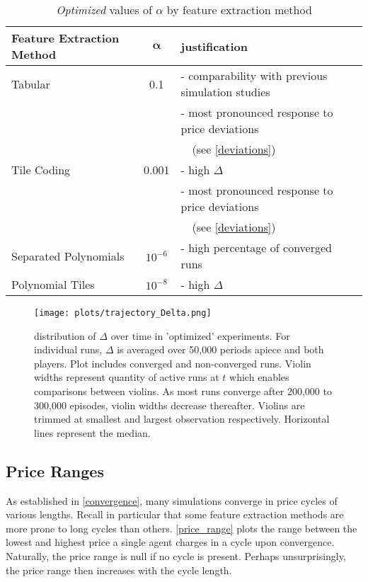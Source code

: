 \begin{table}

	\begin{tabular}{|l|c|l|}
		\hline
		\textbf{Feature Extraction Method}&$\boldsymbol{\alpha}$&\textbf{justification} \\
		\hline
		Tabular&0.1&- comparability with previous simulation studies \\
		&&- most pronounced response to price deviations \\
		&& \ \ (see \autoref{deviations}) \\
		\hline
		Tile Coding&0.001&- high $\Delta$ \\
		&&- most pronounced response to price deviations \\
		&&\ \ (see \autoref{deviations}) \\
		\hline
		Separated Polynomials&$10^{-6}$&- high percentage of converged runs \\
		\hline
		Polynomial Tiles&$10^{-8}$&- high $\Delta$ \\
		\hline
	\end{tabular}
	\caption{\emph{Optimized} values of $\alpha$ by feature extraction method}
	\label{justifications}
\end{table}

\begin{figure}
	\texttt{[image: plots/trajectory\_Delta.png]}
	\caption{distribution of $\Delta$ over time in 'optimized' experiments. For individual runs, $\Delta$ is averaged over 50,000 periods apiece and both players. Plot includes converged and non-converged runs. Violin widths represent quantity of active runs at $t$ which enables comparisons between violins. As most runs converge after 200,000 to 300,000 episodes, violin widths decrease thereafter. Violins are trimmed at smallest and largest observation respectively. Horizontal lines represent the median.}
	\label{trajectory_Delta}
\end{figure}



\subsection{Price Ranges}\label{prices}

As established in \autoref{convergence}, many simulations converge in price cycles of various lengths. Recall in particular that some feature extraction methods are more prone to long cycles than others. \autoref{price_range} plots the range between the lowest and highest price a single agent charges in a cycle upon convergence. Naturally, the price range is null if no cycle is present. Perhaps unsurprisingly, the price range then increases with the cycle length.

